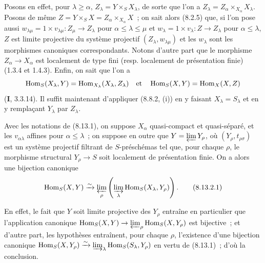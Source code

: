 Posons en effet, pour $\lambda\geqslant\alpha$,
$Z_\lambda=Y\times_S X_\lambda$, de sorte que l'on a
$Z_\lambda=Z_\alpha\times_{X_\alpha}X_\lambda$. Posons de même
$Z=Y\times_S X=Z_\alpha\times_{X_\alpha}X$~; on sait alors (8.2.5) que, si
l'on pose aussi
$w_{\lambda\mu}=1\times v_{\lambda\mu}:Z_\mu\to Z_\lambda$
pour $\alpha\leqslant\lambda\leqslant\mu$ et
$w_\lambda=1\times v_\lambda:Z\to Z_\lambda$ pour $\alpha\leqslant\lambda$,
$Z$ est limite projective du système projectif $(Z_\lambda,w_{\lambda\mu})$
et les $w_\lambda$ sont les morphismes canoniques correspondants. Notons
d'autre part que le morphisme $Z_\alpha\to X_\alpha$ est localement de type
fini (resp. localement de présentation finie) (1.3.4 et 1.4.3). Enfin, on
sait que l'on a
\[
\operatorname{Hom}_S(X_\lambda,Y)
=\operatorname{Hom}_{X_\lambda}(X_\lambda,Z_\lambda)
\quad\hbox{et}\quad
\operatorname{Hom}_S(X,Y)=\operatorname{Hom}_X(X,Z)
\]
(\textbf{I}, 3.3.14). Il suffit maintenant d'appliquer (8.8.2, (i)) en y faisant
$X_\lambda=S_\lambda$ et en y remplaçant $Y_\lambda$ par $Z_\lambda$.

\begin{corollary}[8.13.2]
\label{IV.8.13.2-fr}
Avec les notations de \textup{(8.13.1)}, on suppose $X_\alpha$ quasi-compact et
quasi-séparé, et les $v_{\alpha\lambda}$ affines pour
$\alpha\leqslant\lambda$~; on suppose en outre que
$Y=\varprojlim Y_\rho$, où $(Y_\rho,t_{\rho\sigma})$ est un système
projectif filtrant de $S$-préschémas tel que, pour chaque $\rho$, le morphisme
structural $Y_\rho\to S$ soit localement de présentation finie. On a alors une
bijection canonique
\begin{equation}
\label{IV.8.13.2.1-fr}
\operatorname{Hom}_S(X,Y)
\xrightarrow{\sim}
\varprojlim_\rho\left(\varinjlim_\lambda
\operatorname{Hom}_S(X_\lambda,Y_\rho)\right). \tag{8.13.2.1}
\end{equation}
\end{corollary}

En effet, le fait que $Y$ soit limite projective des $Y_\rho$ entraîne en
particulier que l'application canonique
$\operatorname{Hom}_S(X,Y)\to
\varprojlim_\rho\operatorname{Hom}_S(X,Y_\rho)$
est bijective~; et d'autre part, les hypothèses entraînent, pour chaque
$\rho$, l'existence d'une bijection canonique
$\operatorname{Hom}_S(X,Y_\rho)\xrightarrow{\sim}
\varinjlim_\lambda\operatorname{Hom}_S(S_\lambda,Y_\rho)$
en vertu de (8.13.1)~; d'où la conclusion.

